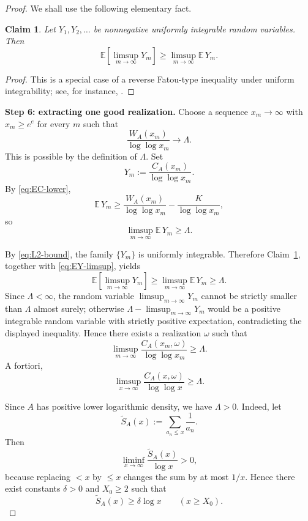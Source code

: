 \documentclass[11pt,letterpaper,reqno]{amsart}
\newtheorem{claim}{Claim}
\theoremstyle{definition}
\numberwithin{equation}{section}
\newcommand{\1}{\mathbf 1}
\begin{document}
\begin{proof}
We shall use the following elementary fact.

\begin{claim}\label{clm:ui-limsup}
Let \(Y_1,Y_2,\dots\) be nonnegative uniformly integrable random variables. Then
\[
\mathbb E\!\left[\limsup_{m\to\infty} Y_m\right]
\ge
\limsup_{m\to\infty}\mathbb E\,Y_m.
\]
\end{claim}

\begin{proof}
This is a special case of a reverse Fatou-type inequality under uniform integrability; see, for instance, \cite[Corollary~4.2]{Kamihigashi2017}.
\end{proof}

\medskip

\noindent
{\bf Step 6: extracting one good realization.}
Choose a sequence $x_m\to\infty$ with $x_m\ge e^e$ for every $m$ such that
\[
\frac{W_A(x_m)}{\log\log x_m}\longrightarrow \Lambda.
\]
This is possible by the definition of \(\Lambda\).
Set
\[
Y_m:=\frac{C_A(x_m)}{\log\log x_m}.
\]
By \eqref{eq:EC-lower},
\[
\mathbb E\,Y_m
\ge
\frac{W_A(x_m)}{\log\log x_m}
-
\frac{K}{\log\log x_m},
\]
so
\begin{equation}\label{eq:EY-limsup}
\limsup_{m\to\infty}\mathbb E\,Y_m\ge \Lambda.
\end{equation}







By \eqref{eq:L2-bound}, the family \(\{Y_m\}\) is uniformly integrable. Therefore Claim~\ref{clm:ui-limsup}, together with \eqref{eq:EY-limsup}, yields
\[
\mathbb E\!\left[\limsup_{m\to\infty}Y_m\right]
\ge
\limsup_{m\to\infty}\mathbb E\,Y_m
\ge \Lambda.
\]
Since \(\Lambda<\infty\), the random variable \(\limsup_{m\to\infty}Y_m\) cannot be strictly smaller than \(\Lambda\) almost surely; otherwise \(\Lambda-\limsup_{m\to\infty}Y_m\) would be a positive integrable random variable with strictly positive expectation, contradicting the displayed inequality. Hence there exists a realization \(\omega\) such that
\[
\limsup_{m\to\infty}\frac{C_A(x_m,\omega)}{\log\log x_m}\ge \Lambda.
\]
A fortiori,
\[
\limsup_{x\to\infty}\frac{C_A(x,\omega)}{\log\log x}\ge \Lambda.
\]


Since \(A\) has positive lower logarithmic density, we have \(\Lambda>0\). Indeed, let
\[
\widetilde S_A(x):=\sum_{a_n\le x}\frac1{a_n}.
\]
Then
\[
\liminf_{x\to\infty}\frac{\widetilde S_A(x)}{\log x}>0,
\]
because replacing \(<x\) by \(\le x\) changes the sum by at most \(1/x\). Hence there exist constants \(\delta>0\) and \(X_0\ge 2\) such that
\[
\widetilde S_A(x)\ge \delta\log x
\qquad (x\ge X_0).
\]



\end{proof}
\end{document}
